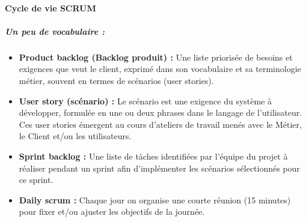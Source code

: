 \paragraph{Cycle de vie SCRUM}
\subparagraph{Un peu de vocabulaire :}
\begin{itemize}
    \item \textbf{Product backlog (Backlog produit) : } Une liste priorisée de besoins et exigences que veut le client, exprimé dans son vocabulaire et sa terminologie métier, souvent en termes de scénarios (user stories).
    \item \textbf{User story (scénario) : }Le scénario est une exigence du système à développer, formulée en une ou deux phrases dans le langage de l'utilisateur. Ces user stories émergent au cours d'ateliers de travail menés avec le Métier, le Client et/ou les utilisateurs.
    \item \textbf{Sprint backlog : }Une liste de tâches identifiées par l'équipe du projet à réaliser pendant un sprint afin d'implémenter les scénarios sélectionnés pour ce sprint.
    \item \textbf{Daily scrum : }Chaque jour on organise une courte réunion (15 minutes) pour fixer et/ou ajuster les objectifs de la journée.
\end{itemize}

